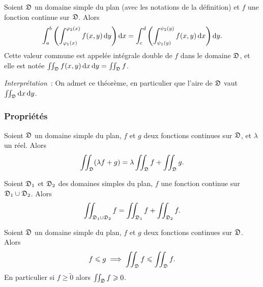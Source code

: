 \begin{defdef}
  Soient \(\mathfrak{D}\) un domaine simple du plan (avec les notations de la définition) et \(f\) une fonction continue sur \(\mathfrak{D}\). Alors
  \begin{equation}
    \int_{a}^{b} \left( \int_{\varphi_1(x)}^{\varphi_2(x)} f(x,y)\mathop{}\mathopen{}\mathrm{d} y\right)\mathop{}\mathopen{}\mathrm{d} x = \int_{c}^{d} \left( \int_{\psi_1(y)}^{\psi_2(y)} f(x,y)\mathop{}\mathopen{}\mathrm{d} x\right)\mathop{}\mathopen{}\mathrm{d} y.
  \end{equation}
  Cette valeur commune est appelée intégrale double de \(f\) dans le domaine \(\mathfrak{D}\), et elle est notée \(\iint_{\mathfrak{D}} f(x,y)\mathop{}\mathopen{}\mathrm{d} x \mathop{}\mathopen{}\mathrm{d} y = \iint_{\mathfrak{D}} f\).
\end{defdef}

\emph{Interprétation}~: On admet ce théorème, en particulier que l'aire de \(\mathfrak{D}\) vaut \(\iint_{\mathfrak{D}}\mathop{}\mathopen{}\mathrm{d} x \mathop{}\mathopen{}\mathrm{d} y\).

\subsubsection{Propriétés}

\begin{prop}[Linéarité]
  Soient \(\mathfrak{D}\) un domaine simple du plan, \(f\) et \(g\) deux fonctions continues sur \(\mathfrak{D}\), et \(\lambda\) un réel. Alors
  \begin{equation}
    \iint_{\mathfrak{D}}(\lambda f+g) = \lambda \iint_{\mathfrak{D}} f + \iint_{\mathfrak{D}} g.
  \end{equation}
\end{prop}
\begin{prop}
  Soient \(\mathfrak{D}_1\) et \(\mathfrak{D}_2\) des domaines simples du plan, \(f\) une fonction continue sur \(\mathfrak{D}_1 \cup \mathfrak{D}_2\). Alors
  \begin{equation}
    \iint_{\mathfrak{D}_1 \cup \mathfrak{D}_2} f = \iint_{\mathfrak{D}_1} f + \iint_{\mathfrak{D}_2} f.
  \end{equation}
\end{prop}
\begin{prop}[Croissance]
  Soient \(\mathfrak{D}\) un domaine simple du plan, \(f\) et \(g\) deux fonctions continues sur \(\mathfrak{D}\). Alors
  \begin{equation}
    f \leqslant g \implies \iint_{\mathfrak{D}} f \leqslant \iint_{\mathfrak{D}} f.
  \end{equation}
  En particulier si \(f \geqslant \tilde{0}\) alors \(\iint_{\mathfrak{D}} f \geqslant 0\).
\end{prop}

